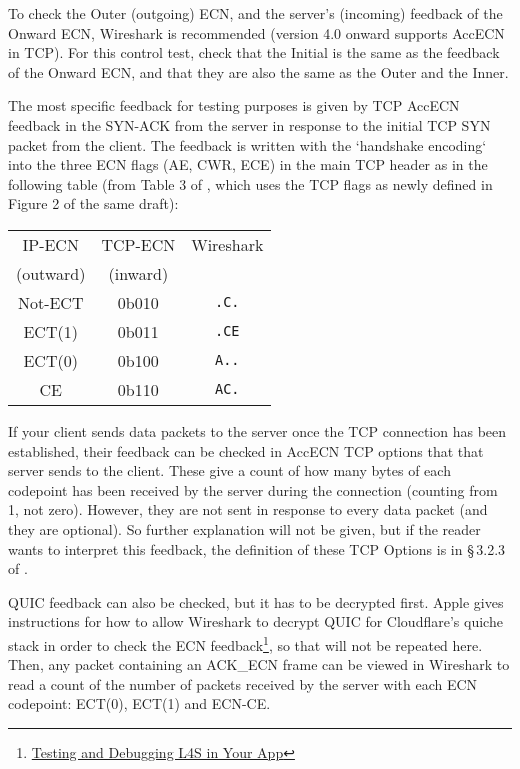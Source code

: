 To check the Outer (outgoing) ECN, and the server's (incoming) feedback of the
Onward ECN, Wireshark is recommended (version 4.0 onward supports AccECN in
TCP). For this control test, check that the Initial is the same as the feedback
of the Onward ECN, and that they are also the same as the Outer and the Inner.

The most specific feedback for testing purposes is given by TCP AccECN feedback
in the SYN-ACK from the server in response to the initial TCP SYN packet from
the client. The feedback is written with the `handshake encoding` into the three
ECN flags (AE, CWR, ECE) in the main TCP header as in the following table (from
Table 3 of \cite{Briscoe14d:accecn_ID}, which uses the TCP flags as newly
defined in Figure 2 of the same draft):

{\centering
\begin{tabular}{ccc}
	IP-ECN    & TCP-ECN  & Wireshark\\
	(outward) & (inward) &\\
	\hline%
	Not-ECT   & 0b010    & \texttt{.C.}\\
	ECT(1)    & 0b011    & \texttt{.CE}\\
	ECT(0)    & 0b100    & \texttt{A..}\\
	CE        & 0b110    & \texttt{AC.}\\
	\hline
\end{tabular}
\par}

If your client sends data packets to the server once the TCP connection has been
established, their feedback can be checked in AccECN TCP options that that
server sends to the client. These give a count of how many bytes of each
codepoint has been received by the server during the connection (counting from
1, not zero). However, they are not sent in response to every data packet (and
they are optional). So further explanation will not be given, but if the reader
wants to interpret this feedback, the definition of these TCP Options is in
\S\,3.2.3 of \cite{Briscoe14d:accecn_ID}.

QUIC feedback can also be checked, but it has to be decrypted first. Apple gives
instructions for how to allow Wireshark to decrypt QUIC for Cloudflare's quiche
stack in order to check the ECN 
feedback\footnote{\href{https://developer.apple.com/documentation/network/testing_and_debugging_l4s_in_your_app}{Testing and Debugging L4S in Your App}}, so that will not be repeated here. Then, any packet containing an ACK\_ECN frame can be viewed in Wireshark to read a count of the number of packets received by the server with each ECN codepoint: ECT(0), ECT(1) and ECN-CE.

